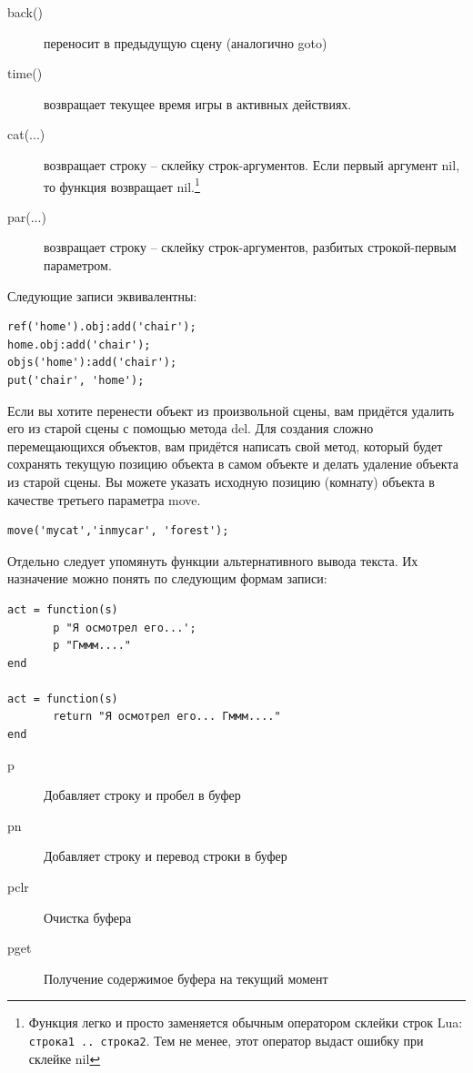 \documentclass[12pt]{article}
\begin{document}
\begin{description}
\item[back()]  переносит в предыдущую сцену (аналогично goto)
\item[time()]  возвращает текущее время игры в активных действиях.
\item[cat(...)]  возвращает строку -- склейку строк-аргументов. Если первый аргумент nil, то функция возвращает nil.\footnote{Функция легко и просто заменяется обычным оператором склейки строк Lua: \texttt{строка1 .. строка2}. Тем не менее, этот оператор выдаст ошибку при склейке nil}
\item[par(...)]  возвращает строку -- склейку строк-аргументов, разбитых строкой-первым параметром.
\end{description}

Следующие записи эквивалентны:

\begin{verbatim}
ref('home').obj:add('chair');
home.obj:add('chair');
objs('home'):add('chair');
put('chair', 'home');
\end{verbatim}

Если вы хотите перенести объект из произвольной сцены, вам придётся удалить его из старой сцены с помощью метода del. Для создания сложно перемещающихся объектов, вам придётся написать свой метод, который будет сохранять текущую позицию объекта в самом объекте и делать удаление объекта из старой сцены. Вы можете указать исходную позицию (комнату) объекта в качестве третьего параметра move.

\begin{verbatim}
move('mycat','inmycar', 'forest');
\end{verbatim}

Отдельно следует упомянуть функции альтернативного вывода текста. Их назначение можно понять по следующим формам записи:

\begin{verbatim}
act = function(s)
       p "Я осмотрел его...';
       p "Гммм...."
end

act = function(s)
       return "Я осмотрел его... Гммм...."
end
\end{verbatim}

\begin{description}
\item[p]  Добавляет строку и пробел в буфер
\item[pn]  Добавляет строку и перевод строки в буфер
\item[pclr]  Очистка буфера
\item[pget]  Получение содержимое буфера на текущий момент
\end{description}
\end{document}
